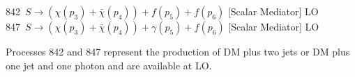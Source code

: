 
842~$S\to({\chi}(p_3)+\bar{\chi}(p_4)) +f(p_5)+f(p_6)$ [Scalar Mediator]   LO\\
847~$S\to({\chi}(p_3)+\bar{\chi}(p_4)) +\gamma(p_5)+f(p_6)$ [Scalar Mediator]   LO

Processes 842 and 847 represent the production of DM plus two jets or
DM plus one jet and one photon and are available at LO.
